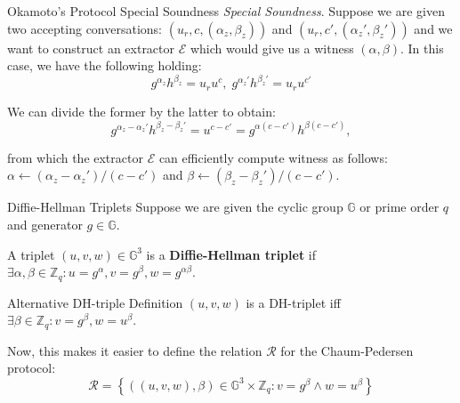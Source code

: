\documentclass{zkdl-presentation-template}
\begin{document}
    \begin{frame}{Okamoto's Protocol Special Soundness}
        \textit{Special Soundness}. Suppose we are given two accepting conversations: $(u_r,c,(\alpha_z,\beta_z))$ and $(u_r,c',(\alpha_z',\beta_z'))$ and we want to construct an extractor $\mathcal{E}$ which would give us a witness $(\alpha,\beta)$. In this case, we have the following holding:
        \begin{equation*}
            g^{\alpha_z}h^{\beta_z} = u_r u^c, \; g^{\alpha_z'}h^{\beta_z'} = u_r u^{c'}
        \end{equation*}
        
        We can divide the former by the latter to obtain:
        \begin{equation*}
            g^{\alpha_z - \alpha_z'}h^{\beta_z - \beta_z'} = u^{c-c'} = g^{\alpha(c-c')}h^{\beta(c-c')},
        \end{equation*}

        from which the extractor $\mathcal{E}$ can efficiently compute witness as follows: $\alpha \gets (\alpha_z - \alpha_z')\big/(c-c')$ and $\beta \gets (\beta_z - \beta_z')\big/(c-c')$.
    \end{frame}

    \begin{frame}{Diffie-Hellman Triplets}
        Suppose we are given the cyclic group $\mathbb{G}$ or prime order $q$ and generator $g \in \mathbb{G}$. 

        \begin{definition}
            A triplet $(u,v,w) \in \mathbb{G}^3$ is a \textbf{Diffie-Hellman triplet} if $\exists \alpha, \beta \in \mathbb{Z}_q: u = g^{\alpha}, v = g^{\beta}, w = g^{\alpha\beta}$.
        \end{definition}

        \begin{block}{Alternative DH-triple Definition}
            $(u,v,w)$ is a DH-triplet iff $\exists \beta \in \mathbb{Z}_q: v = g^{\beta}, w = u^{\beta}$.
        \end{block}

        Now, this makes it easier to define the relation $\mathcal{R}$ for the Chaum-Pedersen protocol:
        \begin{equation*}
            \mathcal{R} = \left\{ ((u,v,w), \beta) \in \mathbb{G}^3 \times \mathbb{Z}_q: v = g^{\beta} \wedge w = u^{\beta} \right\}
        \end{equation*}
    \end{frame}
\end{document}
